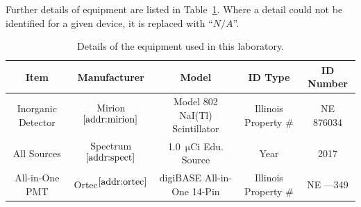 \documentclass[12pt]{article}
\newcommand{\na}{\xspace$N/A$\xspace}
\newcommand{\sref}[1]{$^{\ref{#1}}$}
\newcommand{\micCi}{\xspace$\mathrm{\mu Ci}$\xspace}
\begin{document}
\FloatBarrier
Further details of equipment are listed in Table~\ref{tab:equip}.
Where a detail could not be identified for a given device, it is replaced with ``\na''.
\begin{table}[!h]
    \centering
    \small
    \caption{Details of the equipment used in this laboratory.}
    \label{tab:equip}
    \scriptsize
    \begin{tabular}{c|cccc}
        Item & Manufacturer & Model & ID Type & ID Number\\\hline
        Inorganic Detector & Mirion\sref{addr:mirion} & Model 802 NaI(Tl) Scintillator & Illinois Property \# & NE 876034 \\
        All Sources & Spectrum\sref{addr:spect} & 1.0~\micCi Edu. Source & Year & 2017 \\
        All-in-One PMT & Ortec\sref{addr:ortec} & digiBASE All-in-One 14-Pin & Illinois Property \# & NE ---349 \\

\end{tabular}
\end{table}
\end{document}
